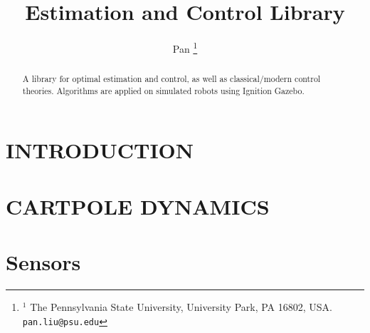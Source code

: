 \documentclass[letterpaper, 10 pt, conference]{ieeeconf}  %
\title{\LARGE \bf
Estimation and Control Library}
\author{Pan %
\thanks{$^{1}$ The Pennsylvania State University, University Park, PA 16802, USA.
        {\tt\small pan.liu@psu.edu}}%
}
\begin{document}
\maketitle
\thispagestyle{empty}
\pagestyle{empty}


\begin{abstract}
A library for optimal estimation and control, as well as classical/modern control theories. Algorithms are applied on simulated robots using Ignition Gazebo.
\end{abstract}


\section{INTRODUCTION} \label{introsec}


\section{CARTPOLE DYNAMICS} \label{carpoledyn}


\section{Sensors} \label{sensors}




\end{document}
